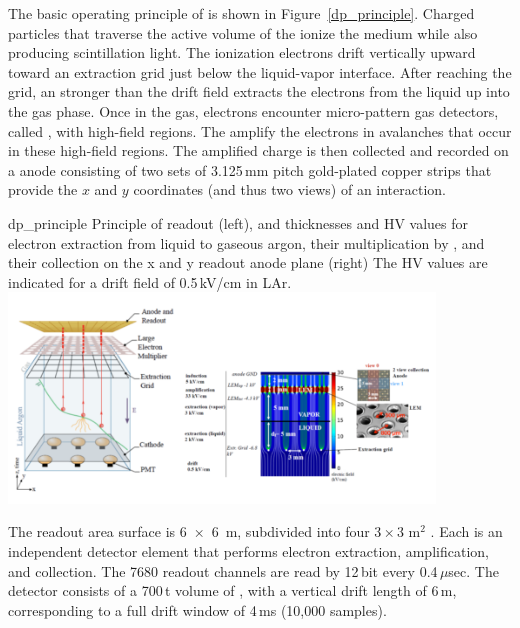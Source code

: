 \documentclass[../main-v1.tex]{subfiles}
\begin{document}
The basic operating principle of  is shown in Figure~\ref{dp_principle}. Charged particles that traverse the active volume of the  ionize the medium while also producing scintillation
light. The ionization electrons drift vertically upward %
toward an extraction grid just below the liquid-vapor interface. 
After reaching the grid,
an \efield stronger than the drift field extracts the electrons from the liquid up into the gas phase.
Once in the gas, electrons encounter micro-pattern gas detectors, called , with high-field regions. The  amplify the electrons in avalanches that occur in these
high-field regions. The amplified charge is then collected and recorded on a \twod anode consisting
of two sets of 3.125\,mm pitch gold-plated copper strips that provide the $x$ and $y$ coordinates (and
thus two views) of an interaction.   

\begin{dunefigure}
{dp_principle} %
{Principle of  readout (left), and thicknesses and HV values for electron extraction from liquid to gaseous argon, their
multiplication by , and their collection on the x and y readout anode plane (right) The HV values are
indicated for a drift field of 0.5\,kV/cm in LAr.}
\includegraphics[width=0.85\textwidth]{graphics/IntroFigures/Fig_11_protodune-dp-principle.png}
\end{dunefigure}

The readout area surface is \SI{6x6}{m}, subdivided into four $3\times3$ m$^2$  . Each  is an independent detector element %
that performs electron extraction, amplification, and collection. 
The 7680 readout channels are read by   12\,bit  every 0.4\,$\mu$sec. 
The  detector   consists of a 700\,t volume of , with  a vertical drift length of 6\,m, corresponding to a full drift window of 4\,ms (10,000 samples).
\end{document}
